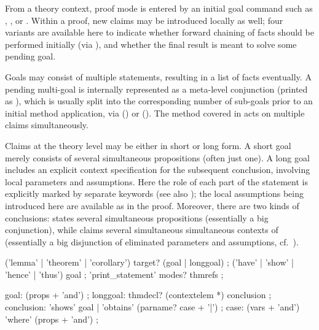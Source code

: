 \begin{isabellebody}
\begin{isamarkuptext}
  From a theory context, proof mode is entered by an initial goal
  command such as \mbox{}, \mbox{}, or
  \mbox{}.  Within a proof, new claims may be
  introduced locally as well; four variants are available here to
  indicate whether forward chaining of facts should be performed
  initially (via \mbox{}), and whether the final result
  is meant to solve some pending goal.

  Goals may consist of multiple statements, resulting in a list of
  facts eventually.  A pending multi-goal is internally represented as
  a meta-level conjunction (printed as \isa{{\isacharampersand}{\isacharampersand}}), which is usually
  split into the corresponding number of sub-goals prior to an initial
  method application, via \mbox{}
  () or \mbox{}
  ().  The \mbox{} method
  covered in  acts on multiple claims
  simultaneously.

  Claims at the theory level may be either in short or long form.  A
  short goal merely consists of several simultaneous propositions
  (often just one).  A long goal includes an explicit context
  specification for the subsequent conclusion, involving local
  parameters and assumptions.  Here the role of each part of the
  statement is explicitly marked by separate keywords (see also
  ); the local assumptions being introduced here
  are available as \mbox{} in the proof.  Moreover, there
  are two kinds of conclusions: \mbox{} states several
  simultaneous propositions (essentially a big conjunction), while
  \mbox{} claims several simultaneous simultaneous
  contexts of (essentially a big disjunction of eliminated parameters
  and assumptions, cf.\ ).

  \begin{rail}
    ('lemma' | 'theorem' | 'corollary') target? (goal | longgoal)
    ;
    ('have' | 'show' | 'hence' | 'thus') goal
    ;
    'print\_statement' modes? thmrefs
    ;
  
    goal: (props + 'and')
    ;
    longgoal: thmdecl? (contextelem *) conclusion
    ;
    conclusion: 'shows' goal | 'obtains' (parname? case + '|')
    ;
    case: (vars + 'and') 'where' (props + 'and')
    ;
  \end{rail}


\end{isamarkuptext}
\end{isabellebody}
